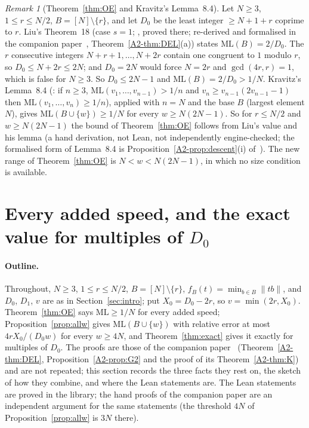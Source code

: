 \documentclass[11pt]{article}
\theoremstyle{definition}
\theoremstyle{remark}
\newtheorem{remark}[theorem]{Remark}
\newcommand{\nd}[1]{\lVert #1\rVert}
\newcommand{\ML}{\mathrm{ML}}
\newcommand{\xB}[1]{\ref{A2-#1}}
\begin{document}
\begin{remark}[Theorem~\ref{thm:OE} and Kravitz's Lemma~8.4]\label{rem:L84}
Let $N\ge3$, $1\le r\le N/2$, $B=[N]\setminus\{r\}$, and let $D_0$ be the least integer $\ge N+1+r$ coprime to $r$. Liu's Theorem~18 (case $s=1$; \cite[p.~16, proof pp.~16--17]{L}, proved there; re-derived and formalised in the companion paper~\cite{A2}, Theorem~\xB{thm:DEL}(a)) states $\ML(B)=2/D_0$. The $r$ consecutive integers $N+r+1,\dots,N+2r$ contain one congruent to $1$ modulo $r$, so $D_0\le N+2r\le2N$; and $D_0=2N$ would force $N=2r$ and $\gcd(4r,r)=1$, which is false for $N\ge3$. So $D_0\le2N-1$ and $\ML(B)=2/D_0>1/N$. Kravitz's Lemma~8.4 (\cite[pp.~15--16]{K}: if $n\ge3$, $\ML(v_1,\dots,v_{n-1})>1/n$ and $v_n\ge v_{n-1}(2v_{n-1}-1)$ then $\ML(v_1,\dots,v_n)\ge1/n$), applied with $n=N$ and the base $B$ (largest element $N$), gives $\ML(B\cup\{w\})\ge1/N$ for every $w\ge N(2N-1)$. So for $r\le N/2$ and $w\ge N(2N-1)$ the bound of Theorem~\ref{thm:OE} follows from Liu's value and his lemma (a hand derivation, not Lean, not independently engine-checked; the formalised form of Lemma~8.4 is Proposition~\xB{prop:descent}(i) of~\cite{A2}). The new range of Theorem~\ref{thm:OE} is $N<w<N(2N-1)$, in which no size condition is available.
\end{remark}


\section{Every added speed, and the exact value for multiples of $D_0$}\label{sec:values}

\paragraph{Outline.}
Throughout, $N\ge3$, $1\le r\le N/2$, $B=[N]\setminus\{r\}$, $f_B(t)=\min_{b\in B}\nd{tb}$, and $D_0$, $D_1$, $v$ are as in Section~\ref{sec:intro}; put $X_0=D_0-2r$, so $v=\min(2r,X_0)$. Theorem~\ref{thm:OE} says $\ML\ge1/N$ for every added speed; Proposition~\ref{prop:allw} gives $\ML(B\cup\{w\})$ with relative error at most $4rX_0/(D_0w)$ for every $w\ge4N$, and Theorem~\ref{thm:exact} gives it exactly for multiples of $D_0$. The proofs are those of the companion paper~\cite{A2} (Theorem~\xB{thm:DEL}, Proposition~\xB{prop:G2} and the proof of its Theorem~\xB{thm:K}) and are not repeated; this section records the three facts they rest on, the sketch of how they combine, and where the Lean statements are. The Lean statements are proved in the library; the hand proofs of the companion paper are an independent argument for the same statements (the threshold $4N$ of Proposition~\ref{prop:allw} is $3N$ there).
\end{document}
